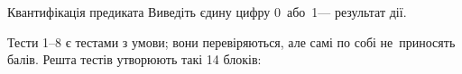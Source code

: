 {\begin{problemAllDefault}{Квантифікація предиката}
\OutputFile
Виведіть єдину цифру 0~або~1\nolinebreak[3] --- результат дії.

\Examples

\ifAfour\vspace*{-\baselineskip}\par\mbox{}\hspace*{5em}\fi
\begin{exampleSimpleExtraNarrow}{2.5em}{3em}
%
%
\end{exampleSimpleExtraNarrow}%
\ifAfour\hspace{-0.5em}\fi
\begin{exampleSimpleExtraNarrow}{2.5em}{3em}
%
%
\end{exampleSimpleExtraNarrow}%
\ifAfour\hspace{-0.5em}\fi
\begin{exampleSimpleExtraNarrow}{2.5em}{3em}
%
%
\end{exampleSimpleExtraNarrow}%
\ifAfour\hspace{-0.5em}\fi
\begin{exampleSimpleExtraNarrow}{2.5em}{3em}
%
%
\end{exampleSimpleExtraNarrow}



\Scoring{}\label{text:scoring-by-blocks-in-quantification-problem-begin}
Тести 1--8 є тестами з умови; вони перевіряються, але самі по собі не~приносять балів.
Решта тестів утворюють такі 14 блоків:

{

\begin{small}

\def\tests#1{\mbox{тести #1;\hspace{0.25em plus 2em}}}
\def\points#1{\mbox{#1 балів;\hspace{0.25em plus 2em}}}
\def\whenChecked#1{перевіряється й оцінюється #1}
\def\checkedAlways{\whenChecked{завжди}}
\def\checkReq#1{\whenChecked{лише в разі успішного проходження тестів #1}}


\end{small}}
\end{problemAllDefault}}
